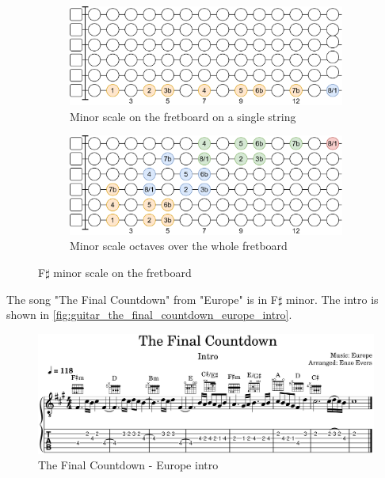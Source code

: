 \begin{figure}[h]
	\vspace{0.5cm}
	
	\begin{subfigure}[b]{\textwidth}
		\centering
		\includegraphics[height=0.175\textheight]{../../Images/guitar_minor_scale_single_string.png}
		\caption{Minor scale on the fretboard on a single string}
		\label{fig:guitar_minor_scale_fretboard_single_string}
	\end{subfigure}
	
	\vspace{0.5cm}
	
	\begin{subfigure}[b]{\textwidth}
		\centering
		\includegraphics[height=0.175\textheight]{../../Images/guitar_minor_scale_octaves_over_fretboard.png}
		\caption{Minor scale octaves over the whole fretboard}
		\label{fig:guitar_minor_scale_octaves_over_fretboard}
	\end{subfigure}
	
	\caption{F$\sharp$ minor scale on the fretboard}
	\label{fig:guitar_minor_scale_fretboard}
\end{figure}

\clearpage

The song "The Final Countdown" from "Europe" is in F$\sharp$ minor. The intro is shown in \autoref{fig:guitar_the_final_countdown_europe_intro}.

\begin{figure}[h]
	\centering
	\includegraphics[width=\textwidth]{../../MuseScore/Guitar/GuitarTheFinalCountdownEuropeIntro.png}
	\caption{The Final Countdown - Europe intro}
	\label{fig:guitar_the_final_countdown_europe_intro}
\end{figure}

